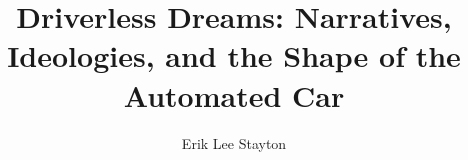 % 
% 
%
%
%
%
%
%
%
% 
% 

\title{Driverless Dreams: Narratives, Ideologies, and the Shape of the
Automated Car}




\author{Erik Lee Stayton}

